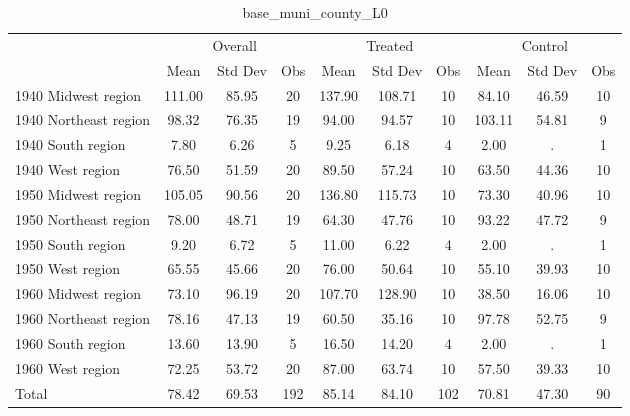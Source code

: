 \begin{table}[htbp]\centering
\def\sym#1{\ifmmode^{#1}\else\(^{#1}\)\fi}
\caption{base\_muni\_county\_L0 \label{tab1}}
\begin{tabular}{l*{3}{ccc}}
\toprule
                    &\multicolumn{3}{c}{Overall}           &\multicolumn{3}{c}{Treated}           &\multicolumn{3}{c}{Control}           \\
                    &        Mean&     Std Dev&         Obs&        Mean&     Std Dev&         Obs&        Mean&     Std Dev&         Obs\\
\midrule
1940 Midwest region &      111.00&       85.95&          20&      137.90&      108.71&          10&       84.10&       46.59&          10\\
1940 Northeast region&       98.32&       76.35&          19&       94.00&       94.57&          10&      103.11&       54.81&           9\\
1940 South region   &        7.80&        6.26&           5&        9.25&        6.18&           4&        2.00&           .&           1\\
1940 West region    &       76.50&       51.59&          20&       89.50&       57.24&          10&       63.50&       44.36&          10\\
1950 Midwest region &      105.05&       90.56&          20&      136.80&      115.73&          10&       73.30&       40.96&          10\\
1950 Northeast region&       78.00&       48.71&          19&       64.30&       47.76&          10&       93.22&       47.72&           9\\
1950 South region   &        9.20&        6.72&           5&       11.00&        6.22&           4&        2.00&           .&           1\\
1950 West region    &       65.55&       45.66&          20&       76.00&       50.64&          10&       55.10&       39.93&          10\\
1960 Midwest region &       73.10&       96.19&          20&      107.70&      128.90&          10&       38.50&       16.06&          10\\
1960 Northeast region&       78.16&       47.13&          19&       60.50&       35.16&          10&       97.78&       52.75&           9\\
1960 South region   &       13.60&       13.90&           5&       16.50&       14.20&           4&        2.00&           .&           1\\
1960 West region    &       72.25&       53.72&          20&       87.00&       63.74&          10&       57.50&       39.33&          10\\
Total               &       78.42&       69.53&         192&       85.14&       84.10&         102&       70.81&       47.30&          90\\
\bottomrule
\end{tabular}
\end{table}
